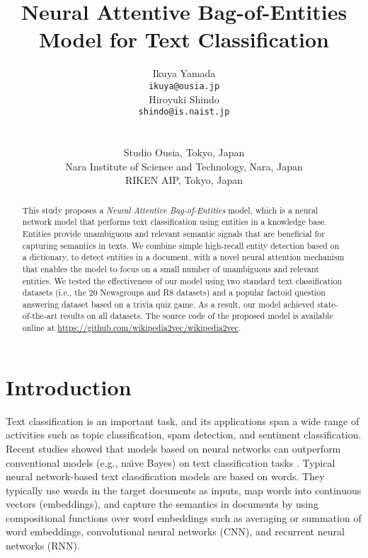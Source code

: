 \documentclass[11pt,a4paper]{article}
\title{Neural Attentive Bag-of-Entities Model for Text Classification}
\author{
    \begin{minipage}{13em}
        \begin{center}
            Ikuya Yamada\\
            {\tt ikuya@ousia.jp}
        \end{center}
    \end{minipage}
    \begin{minipage}{13em}
        \begin{center}
            Hiroyuki Shindo\\
            {\tt shindo@is.naist.jp}
        \end{center}
    \end{minipage}
    \\
    \\
    Studio Ousia, Tokyo, Japan\\
    Nara Institute of Science and Technology, Nara, Japan\\
    RIKEN AIP, Tokyo, Japan
}
\date{}
\begin{document}
    \maketitle
    \begin{abstract}
        This study proposes a \textit{Neural Attentive Bag-of-Entities} model, which is a neural network model that performs text classification using entities in a knowledge base.
        Entities provide unambiguous and relevant semantic signals that are beneficial for capturing semantics in texts.
        We combine simple high-recall entity detection based on a dictionary, to detect entities in a document, with a novel neural attention mechanism that enables the model to focus on a small number of unambiguous and relevant entities.
        We tested the effectiveness of our model using two standard text classification datasets (i.e., the 20 Newsgroups and R8 datasets) and a popular factoid question answering dataset based on a trivia quiz game.
        As a result, our model achieved state-of-the-art results on all datasets.
        The source code of the proposed model is available online at \url{https://github.com/wikipedia2vec/wikipedia2vec}.
    \end{abstract}

    \section{Introduction}

    Text classification is an important task, and its applications span a wide range of activities such as topic classification, spam detection, and sentiment classification.
    Recent studies showed that models based on neural networks can outperform conventional models (e.g., na\"{\i}ve Bayes) on text classification tasks \cite{kim:2014:EMNLP2014,iyyer-EtAl:2015,tang-qin-liu:2015:EMNLP,NIPS2015_5949,Jin2016,joulin-EtAl:2017:EACLshort,P18-1041}.
    Typical neural network-based text classification models are based on words.
    They typically use words in the target documents as inputs, map words into continuous vectors (embeddings), and capture the semantics in documents by using compositional functions over word embeddings such as averaging or summation of word embeddings, convolutional neural networks (CNN), and recurrent neural networks (RNN).
\end{document}
